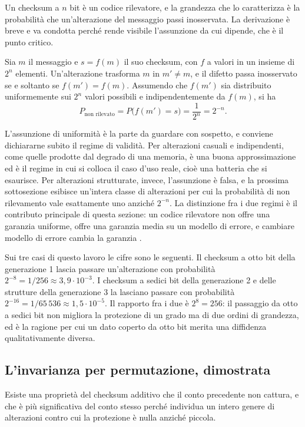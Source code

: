 Un checksum a $n$ bit è un codice rilevatore, e la grandezza che lo caratterizza è la probabilità che un'alterazione del messaggio passi inosservata. La derivazione è breve e va condotta perché rende visibile l'assunzione da cui dipende, che è il punto critico.

Sia $m$ il messaggio e $s = f(m)$ il suo checksum, con $f$ a valori in un insieme di $2^n$ elementi. Un'alterazione trasforma $m$ in $m' \ne m$, e il difetto passa inosservato se e soltanto se $f(m') = f(m)$. Assumendo che $f(m')$ sia distribuito uniformemente sui $2^n$ valori possibili e indipendentemente da $f(m)$, si ha
\[
P_{\text{non rilevato}} = P\big(f(m') = s\big) = \frac{1}{2^n} = 2^{-n}.
\]

L'assunzione di uniformità è la parte da guardare con sospetto, e conviene dichiararne subito il regime di validità. Per alterazioni casuali e indipendenti, come quelle prodotte dal degrado di una memoria, è una buona approssimazione ed è il regime in cui si colloca il caso d'uso reale, cioè una batteria che si esaurisce. Per alterazioni strutturate, invece, l'assunzione è falsa, e la prossima sottosezione esibisce un'intera classe di alterazioni per cui la probabilità di non rilevamento vale esattamente uno anziché $2^{-n}$. La distinzione fra i due regimi è il contributo principale di questa sezione: un codice rilevatore non offre una garanzia uniforme, offre una garanzia media su un modello di errore, e cambiare modello di errore cambia la garanzia \cite{lin-costello}.

Sui tre casi di questo lavoro le cifre sono le seguenti. Il checksum a otto bit della generazione 1 lascia passare un'alterazione con probabilità $2^{-8} = 1/256 \approx 3{,}9 \cdot 10^{-3}$. I checksum a sedici bit della generazione 2 e delle strutture della generazione 3 la lasciano passare con probabilità $2^{-16} = 1/65\,536 \approx 1{,}5 \cdot 10^{-5}$. Il rapporto fra i due è $2^8 = 256$: il passaggio da otto a sedici bit non migliora la protezione di un grado ma di due ordini di grandezza, ed è la ragione per cui un dato coperto da otto bit merita una diffidenza qualitativamente diversa.

\subsection{L'invarianza per permutazione, dimostrata}

Esiste una proprietà del checksum additivo che il conto precedente non cattura, e che è più significativa del conto stesso perché individua un intero genere di alterazioni contro cui la protezione è nulla anziché piccola.

